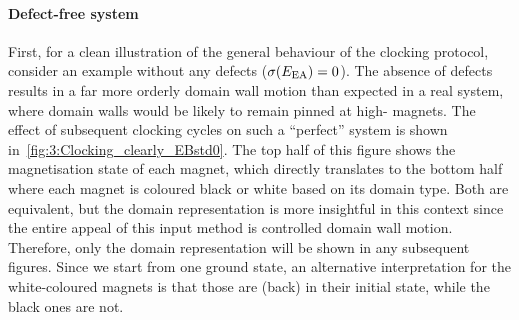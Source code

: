 \paragraph{Defect-free system}
First, for a clean illustration of the general behaviour of the clocking protocol, consider an example without any defects ($\sigma(E_\mathrm{EA}) = 0$).
The absence of defects results in a far more orderly domain wall motion than expected in a real system, where domain walls would be likely to remain pinned at high- magnets.
The effect of subsequent clocking cycles on such a ``perfect'' system is shown in~\cref{fig:3:Clocking_clearly_EBstd0}.
The top half of this figure shows the magnetisation state of each magnet, which directly translates to the bottom half where each magnet is coloured black or white based on its domain type.
Both are equivalent, but the domain representation is more insightful in this context since the entire appeal of this input method is controlled domain wall motion.
Therefore, only the domain representation will be shown in any subsequent figures.
Since we start from one ground state, an alternative interpretation for the white-coloured magnets is that those are (back) in their initial state, while the black ones are not.


